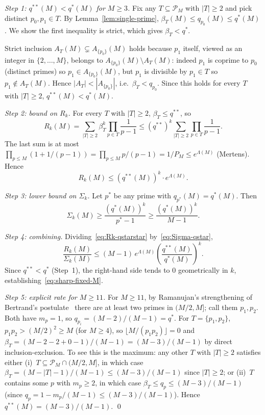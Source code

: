 \documentclass[11pt]{article}
\theoremstyle{remark}
\newcommand{\PM}{\mathcal{P}_M}
\begin{document}
\emph{Step 1: $q^{**}(M) < q^{*}(M)$ for $M \geq 3$.} Fix any $T \subseteq \PM$ with $|T| \geq 2$ and pick distinct $p_0, p_1 \in T$. By Lemma~\ref{lem:single-prime}, $\beta_T(M) \leq q_{p_0}(M) \leq q^*(M)$. We show the first inequality is strict, which gives $\beta_T < q^*$.

Strict inclusion $A_T(M) \subsetneq A_{\{p_0\}}(M)$ holds because $p_1$ itself, viewed as an integer in $\{2, \ldots, M\}$, belongs to $A_{\{p_0\}}(M) \setminus A_T(M)$: indeed $p_1$ is coprime to $p_0$ (distinct primes) so $p_1 \in A_{\{p_0\}}(M)$, but $p_1$ is divisible by $p_1 \in T$ so $p_1 \notin A_T(M)$. Hence $|A_T| < |A_{\{p_0\}}|$, i.e.\ $\beta_T < q_{p_0}$. Since this holds for every $T$ with $|T| \geq 2$, $q^{**}(M) < q^*(M)$.

\emph{Step 2: bound on $R_k$.} For every $T$ with $|T| \geq 2$, $\beta_T \leq q^{**}$, so
\[
R_k(M) = \sum_{|T| \geq 2}\beta_T^k \prod_{p \in T}\frac{1}{p-1} \leq (q^{**})^k \sum_{|T| \geq 2}\prod_{p \in T}\frac{1}{p-1}.
\]
The last sum is at most $\prod_{p \leq M}(1 + 1/(p-1)) = \prod_{p \leq M}p/(p-1) = 1/P_M \leq e^{\Lambda(M)}$ (Mertens). Hence
\begin{equation}\label{eq:Rk-qstarstar}
R_k(M) \leq (q^{**}(M))^k \cdot e^{\Lambda(M)}.
\end{equation}

\emph{Step 3: lower bound on $\Sigma_k$.} Let $p^*$ be any prime with $q_{p^*}(M) = q^*(M)$. Then
\begin{equation}\label{eq:Sigma-qstar}
\Sigma_k(M) \geq \frac{(q^*(M))^k}{p^* - 1} \geq \frac{(q^*(M))^k}{M-1}.
\end{equation}

\emph{Step 4: combining.} Dividing~\eqref{eq:Rk-qstarstar} by~\eqref{eq:Sigma-qstar},
\[
\frac{R_k(M)}{\Sigma_k(M)} \leq (M-1)\, e^{\Lambda(M)}\left(\frac{q^{**}(M)}{q^*(M)}\right)^{\!k}.
\]
Since $q^{**} < q^*$ (Step~1), the right-hand side tends to $0$ geometrically in $k$, establishing~\eqref{eq:sharp-fixed-M}.

\emph{Step 5: explicit rate for $M \geq 11$.} For $M \geq 11$, by Ramanujan's strengthening of Bertrand's postulate~\cite{Ramanujan1919} there are at least two primes in $(M/2, M]$; call them $p_1, p_2$. Both have $m_p = 1$, so $q_{p_i} = (M-2)/(M-1) = q^*$. For $T = \{p_1, p_2\}$, $p_1 p_2 > (M/2)^2 \geq M$ (for $M \geq 4$), so $\lfloor M/(p_1 p_2)\rfloor = 0$ and $\beta_T = (M - 2 - 2 + 0 - 1)/(M-1) = (M-3)/(M-1)$ by direct inclusion-exclusion. To see this is the maximum: any other $T$ with $|T| \geq 2$ satisfies either (i)~$T \subseteq \PM \cap (M/2, M]$, in which case $\beta_T = (M - |T| - 1)/(M-1) \leq (M-3)/(M-1)$ since $|T| \geq 2$; or (ii)~$T$ contains some $p$ with $m_p \geq 2$, in which case $\beta_T \leq q_p \leq (M-3)/(M-1)$ (since $q_p = 1 - m_p/(M-1) \leq (M-3)/(M-1)$). Hence $q^{**}(M) = (M-3)/(M-1)$.
\qed
\end{document}
